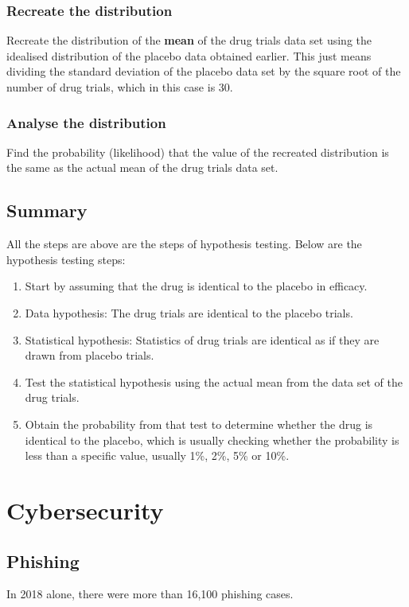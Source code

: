 \documentclass[11pt]{article}
\begin{document}
\subsubsection{Recreate the distribution}
\label{sec:org5412484}
Recreate the distribution of the \textbf{mean} of the drug trials data set using the idealised distribution of the placebo data obtained earlier. This just means dividing the standard deviation of the placebo data set by the square root of the number of drug trials, which in this case is 30.
\subsubsection{Analyse the distribution}
\label{sec:org3ec2800}
Find the probability (likelihood) that the value of the recreated distribution is the same as the actual mean of the drug trials data set.
\subsection{Summary}
\label{sec:org8aafa2a}
All the steps are above are the steps of hypothesis testing. Below are the hypothesis testing steps:

\begin{enumerate}
\item Start by assuming that the drug is identical to the placebo in efficacy.
\item Data hypothesis: The drug trials are identical to the placebo trials.
\item Statistical hypothesis: Statistics of drug trials are identical as if they are drawn from placebo trials.
\item Test the statistical hypothesis using the actual mean from the data set of the drug trials.
\item Obtain the probability from that test to determine whether the drug is identical to the placebo, which is usually checking whether the probability is less than a specific value, usually 1\%, 2\%, 5\% or 10\%.
\end{enumerate}
\section{Cybersecurity}
\label{sec:org67c3281}

\subsection{Phishing}
\label{sec:org91f7af5}
In 2018 alone, there were more than 16,100 phishing cases.
\end{document}
